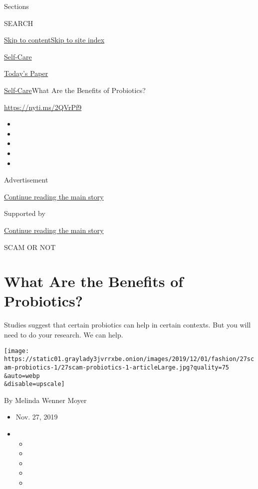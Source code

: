 Sections

SEARCH

\protect\hyperlink{site-content}{Skip to
content}\protect\hyperlink{site-index}{Skip to site index}

\href{https://www.nytimes3xbfgragh.onion/section/style/self-care/}{Self-Care}

\href{https://myaccount.nytimes3xbfgragh.onion/auth/login?response_type=cookie\&client_id=vi}{}

\href{https://www.nytimes3xbfgragh.onion/section/todayspaper}{Today's
Paper}

\href{/section/style/self-care/}{Self-Care}\textbar{}What Are the
Benefits of Probiotics?

\url{https://nyti.ms/2QVrPf9}

\begin{itemize}
\item
\item
\item
\item
\item
\end{itemize}

Advertisement

\protect\hyperlink{after-top}{Continue reading the main story}

Supported by

\protect\hyperlink{after-sponsor}{Continue reading the main story}

SCAM OR NOT

\hypertarget{what-are-the-benefits-of-probiotics}{%
\section{What Are the Benefits of
Probiotics?}\label{what-are-the-benefits-of-probiotics}}

Studies suggest that certain probiotics can help in certain contexts.
But you will need to do your research. We can help.

\texttt{[image: https://static01.graylady3jvrrxbe.onion/images/2019/12/01/fashion/27scam-probiotics-1/27scam-probiotics-1-articleLarge.jpg?quality=75\\\&auto=webp\\\&disable=upscale]}

By Melinda Wenner Moyer

\begin{itemize}
\item
  Nov. 27, 2019
\item
  \begin{itemize}
  \item
  \item
  \item
  \item
  \item
  \end{itemize}
\end{itemize}

